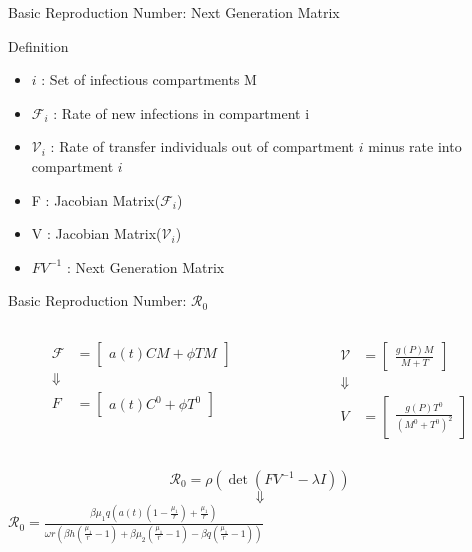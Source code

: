 \documentclass{beamer}
\begin{document}
\begin{frame}{Basic Reproduction Number: Next Generation Matrix}
    \begin{block}{Definition}
        \begin{itemize}
            \item $i$ : Set of infectious compartments {M}
            \item $\mathscr{F}_{i}$ : Rate of new infections in compartment i
            \item $\mathscr{V}_{i}$ : Rate of transfer individuals out of compartment $i$ minus rate into compartment $i$
            \item F : Jacobian Matrix($\mathscr{F}_i$)
            \item V : Jacobian Matrix($\mathscr{V}_i$)
            \item $FV^{-1}$ : Next Generation Matrix
        \end{itemize}
    \end{block}
\end{frame}

\begin{frame}{Basic Reproduction Number: $\mathscr{R}_{0}$}
    \begin{columns}
        \begin{column}{0.5\textwidth}
            \begin{align*}
                \mathscr{F} &= \begin{bmatrix} a(t)CM+\phi TM \end{bmatrix}\\
                \Downarrow\\
                F &= \begin{bmatrix} a(t)C^{0} + \phi T^{0} \end{bmatrix}
            \end{align*}
        \end{column}
        \begin{column}{0.5\textwidth}
            \begin{align*}
                \mathscr{V} &= \begin{bmatrix} \frac{g(P)M}{M+T} \end{bmatrix}\\
                \Downarrow\\
                V &= \begin{bmatrix} \frac{g(P)T^{0}}{(M^{0}+T^{0})^{2}} \end{bmatrix}
            \end{align*}
        \end{column}
    \end{columns}
    $$\mathscr{R}_{0} = \rho(\det(FV^{-1} - \lambda I))$$
    $$\Downarrow$$
    \centering
    $\displaystyle {\mathscr{R}}_{0} = \frac{\beta \mu_{1}q(a(t)(1 - \frac{\mu_{1}}{r}) + \frac{\mu_{1}}{r})}{\omega r (\beta h (\frac{\mu_{1}}{r}-1) + \beta \mu_{2} (\frac{\mu_{1}}{r}-1) - \beta q(\frac{\mu_{1}}{r}-1))}$
\end{frame}
\end{document}
